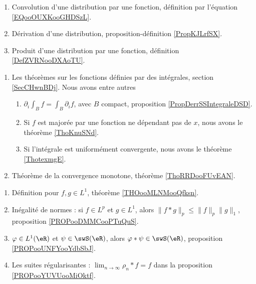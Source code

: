 \begin{enumerate}
    \item
        Convolution d'une distribution par une fonction, définition par l'équation \eqref{EQooOUXKooGHDSzL}.
    \item
        Dérivation d'une distribution, proposition-définition \ref{PropKJLrfSX}.
    \item
        Produit d'une distribution par une fonction, définition \ref{DefZVRNooDXAoTU}.
\end{enumerate}

\begin{enumerate}
    \item 
        Les théorèmes sur les fonctions définies par des intégrales, section \ref{SecCHwnBDj}. Nous avons entre autres
        \begin{enumerate}
            \item
                \( \partial_i\int_Bf=\int_B\partial_if\), avec \( B\) compact, proposition \ref{PropDerrSSIntegraleDSD}.
            \item
                Si \( f\) est majorée par une fonction ne dépendant pas de \( x\), nous avons le théorème \ref{ThoKnuSNd}.
            \item
                Si l'intégrale est uniformément convergente, nous avons le théorème \ref{ThotexmgE}.
        \end{enumerate}
    \item 
        Théorème de la convergence monotone, théorème \ref{ThoRRDooFUvEAN}.
\end{enumerate}

\begin{enumerate}
    \item
        Définition pour \( f,g\in L^1\), théorème \ref{THOooMLNMooQfksn}.
    \item
        Inégalité de normes : si \( f\in L^p\) et \( g\in L^1\), alors \( \| f*g \|_p\leq \| f \|_p\| g \|_1\), proposition \ref{PROPooDMMCooPTuQuS}.
    \item
        \( \varphi\in L^1(\eR)\) et \( \psi\in\swS(\eR)\), alors \( \varphi * \psi\in \swS(\eR)\), proposition \ref{PROPooUNFYooYdbSbJ}.
    \item
        Les suites régularisantes : \( \lim_{n\to \infty} \rho_n*f=f\) dans la proposition \ref{PROPooYUVUooMiOktf}.
\end{enumerate}

